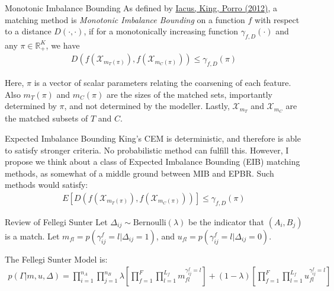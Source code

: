 \documentclass{beamer}
\begin{document}
\begin{frame}{Monotonic Imbalance Bounding}
	As defined by \href{https://gking.harvard.edu/files/gking/files/cem_jasa.pdf}{Iacus, King, Porro (2012)}, a matching method is \emph{Monotonic Imbalance Bounding} on a function $f$ with respect to a distance $D(\cdot, \cdot)$, if for a monotonically increasing function $\gamma_{f, D}(\cdot)$ and any $\pi \in \mathbb{R}_{+}^K$, we have
	\begin{align*}
		D(f(\mathcal{X}_{m_T(\pi)}), f(\mathcal{X}_{m_C(\pi)})) \leq \gamma_{f, D}(\pi)
	\end{align*}
	
	Here, $\pi$ is a vector of scalar parameters relating the coarsening of each feature. Also ${m_T(\pi)}$ and ${m_C(\pi)}$ are the sizes of the matched sets, importantly determined by $\pi$, and not determined by the modeller. Lastly, $\mathcal{X}_{m_T}$ and $\mathcal{X}_{m_C}$ are the matched subsets of $T$ and $C$.
\end{frame}

\begin{frame}{Expected Imbalance Bounding}
	King's CEM is deterministic, and therefore is able to satisfy stronger criteria. No probabilistic method can fulfill this. However, I propose we think about  a class of Expected Imbalance Bounding (EIB) matching methods, as somewhat of a middle ground between MIB and EPBR. Such methods would satisfy:
	\begin{align*}
		E\left[D(f(\mathcal{X}_{m_T(\pi)}), f(\mathcal{X}_{m_C(\pi)}))\right] \leq \gamma_{f, D}(\pi)
	\end{align*}
	
\end{frame}

\begin{frame}{Review of Fellegi Sunter}
	Let $\Delta_{ij} \sim \text{Bernoulli}(\lambda)$ be the indicator that  $(A_i, B_j)$ is a match. Let $m_{fl} = p(\gamma_{ij}^f = l | \Delta_{ij} = 1)$, and $u_{fl} = p(\gamma_{ij}^f = l | \Delta_{ij} = 0)$. \linebreak
	
	The Fellegi Sunter Model is:
	\begin{align*}
		p(\Gamma| m, u, \Delta) = \prod_{i=1}^{n_A} \prod_{j=1}^{n_B} \lambda\left[\prod_{f=1}^F \prod_{l = 1}^{L_f}m_{fl}^{\gamma_{ij}^f = l}\right]  + (1 - \lambda) \left[\prod_{f=1}^F \prod_{l = 1}^{L_f}u_{fl}^{\gamma_{ij}^f = l}\right] 
	\end{align*}
\end{frame}
\end{document}
